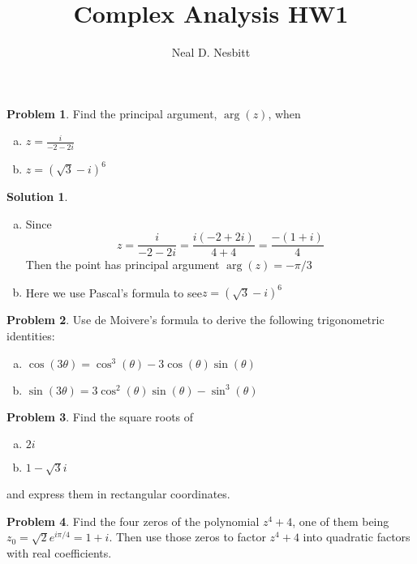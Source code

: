 \documentclass{article}
\title{Complex Analysis HW1\\}
\author{Neal D. Nesbitt}
\begin{document}
\maketitle

\theoremstyle{definition}
\newtheorem{problem}{Problem}
\newtheorem{solution}{Solution}[problem]
\renewcommand{\thesolution}{\theproblem}

\begin{problem}
Find the principal argument, $\arg (z)$, when
\begin{enumerate}[(a)]
\item $z = \frac{i}{-2-2i}$
\item $z = (\sqrt{3}-i)^{6}$
\end{enumerate}
\end{problem}

\begin{solution}
\begin{enumerate}[(a)]
\item  Since 
\[ z = \frac{i}{-2-2i} = \frac{i(-2+2i)}{4+4} = \frac{-(1+i)}{4} \]
Then the point has principal argument $\arg(z)=-\pi/3$
\item Here we use Pascal's formula to see$z = (\sqrt{3}-i)^{6}$
\end{enumerate}
\end{solution}

\begin{problem}
Use de Moivere's formula to derive the following trigonometric identities:
\begin{enumerate}[(a)]
\item $\cos (3\theta) = \cos^{3}(\theta) -3\cos(\theta)\sin(\theta)$
\item $\sin(3\theta) = 3\cos^{2}(\theta)\sin(\theta) -\sin^{3}(\theta)$
\end{enumerate}
\end{problem}

\begin{problem}
Find the square roots of
\begin{enumerate}[(a)]
\item $2i$
\item $1-\sqrt{3}i$
\end{enumerate}
and express them in rectangular coordinates.
\end{problem}

\begin{problem}
Find the four zeros of the polynomial $z^{4}+4$, one of them being $z_{0}=\sqrt{2}e^{i\pi/4} = 1+i$. Then use those zeros to factor $z^{4}+4$ into quadratic factors with real coefficients.
\end{problem}
\end{document}
